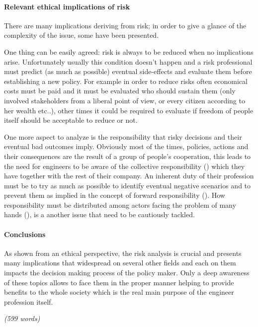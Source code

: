 \paragraph{Relevant ethical implications of risk}
There are many implications deriving from risk; in order to give a glance of the complexity of the issue, some have been presented.

One thing can be easily agreed: risk is always to be reduced when no implications arise.  Unfortunately usually this condition doesn’t happen and a risk professional must predict (as much as possible) eventual side-effects and evaluate them before establishing a new policy. For example in order to reduce risks often economical costs must be paid and it must be evaluated who should sustain them (only involved stakeholders from a liberal point of view, or every citizen according to her wealth etc..), other times it could be required to evaluate if freedom of people itself should be acceptable to reduce or not.

One more aspect to analyze is the responsibility that risky decisions and their eventual bad outcomes imply. Obviously most of the times, policies, actions and their consequences are the result of a group of people's cooperation, this leads to the need for engineers to be aware of the collective responsibility (\cite{VANDEPOEL2018MoralHands.}) which they have together with the rest of their company. An inherent duty of their profession must be to try as much as possible to identify eventual negative scenarios and to prevent them as implied in the concept of forward responsibility (\cite{VANDEPOEL2018MoralHands.}). How responsibility must be distributed among actors facing the problem of many hands (\cite{VANDEPOEL2018MoralHands.}), is a another issue that need to be cautiously tackled.

\newpage
\paragraph{Conclusions}
As shown from an ethical perspective, the risk analysis is crucial and presents many implications that widespread on several other fields and each on them impacts the decision making process of the policy maker. Only a deep awareness of these topics allows to face them in the proper manner helping to provide benefits to the whole society which is the real main purpose of the engineer profession itself.

\emph{(599 words)}